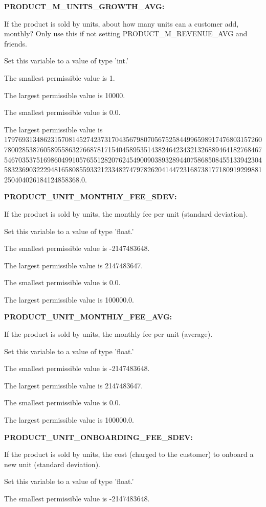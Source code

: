 \textbf{PRODUCT\_M\_UNITS\_GROWTH\_AVG:}


If the product is sold by units, about how many units can a customer add, monthly?  Only use this if not setting PRODUCT\_M\_REVENUE\_AVG and friends.

Set this variable to a value of type 'int.'

The smallest permissible value is 1.

The largest permissible value is 10000.

The smallest permissible value is 0.0.

The largest permissible value is 179769313486231570814527423731704356798070567525844996598917476803157260780028538760589558632766878171540458953514382464234321326889464182768467546703537516986049910576551282076245490090389328944075868508455133942304583236903222948165808559332123348274797826204144723168738177180919299881250404026184124858368.0.


\textbf{PRODUCT\_UNIT\_MONTHLY\_FEE\_SDEV:}


If the product is sold by units, the monthly fee per unit (standard deviation).

Set this variable to a value of type 'float.'

The smallest permissible value is -2147483648.

The largest permissible value is 2147483647.

The smallest permissible value is 0.0.

The largest permissible value is 100000.0.


\textbf{PRODUCT\_UNIT\_MONTHLY\_FEE\_AVG:}


If the product is sold by units, the monthly fee per unit (average).

Set this variable to a value of type 'float.'

The smallest permissible value is -2147483648.

The largest permissible value is 2147483647.

The smallest permissible value is 0.0.

The largest permissible value is 100000.0.


\textbf{PRODUCT\_UNIT\_ONBOARDING\_FEE\_SDEV:}


If the product is sold by units, the cost (charged to the customer) to onboard a new unit (standard deviation).

Set this variable to a value of type 'float.'

The smallest permissible value is -2147483648.

